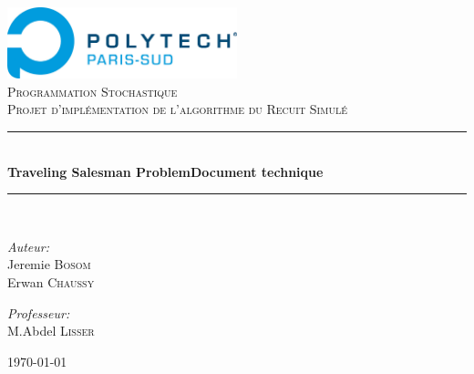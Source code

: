 \newcommand{\HRule}{\rule{\linewidth}{0.5mm}}

\begin{titlepage}
\begin{center}

\includegraphics[width=0.5\textwidth]{../polytech}~\\[1cm]

\textsc{\LARGE Programmation Stochastique}\\[1.5cm]

\textsc{\Large Projet d'implémentation de l'algorithme du Recuit Simulé}\\[0.5cm]

\HRule \\[0.4cm]
{ \huge \bfseries Traveling Salesman Problem\newline Document technique\\[0.4cm] }
\HRule \\[1.5cm]

\begin{minipage}{0.4\textwidth}
\begin{flushleft} \large
\emph{Auteur:}\\
Jeremie \textsc{Bosom}\\
Erwan \textsc{Chaussy}
\end{flushleft}
\end{minipage}
\begin{minipage}{0.4\textwidth}
\begin{flushright} \large
\emph{Professeur:} \\
M.Abdel \textsc{Lisser}
\end{flushright}
\end{minipage}

\vfill

{\large \today}

\end{center}
\end{titlepage}
